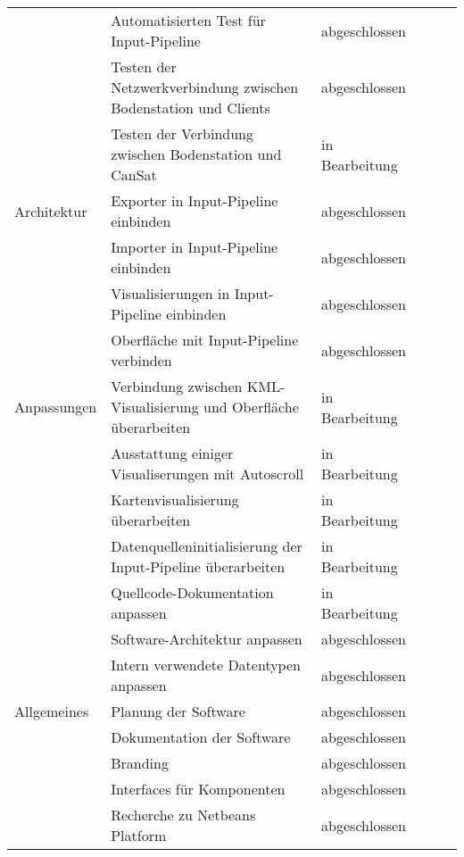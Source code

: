 \begin{table}[H]
\begin{tabular}{p{3cm}p{7cm}p{3cm}rrr}
	& Automatisierten Test für Input-Pipeline & abgeschlossen \\
	& Testen der Netzwerkverbindung zwischen Bodenstation und Clients & abgeschlossen \\
	& Testen der Verbindung zwischen Bodenstation und CanSat & in Bearbeitung \\
	\midrule
	Architektur & Exporter in Input-Pipeline einbinden & abgeschlossen \\
	& Importer in Input-Pipeline einbinden & abgeschlossen \\
	& Visualisierungen in Input-Pipeline einbinden & abgeschlossen \\
	& Oberfläche mit Input-Pipeline verbinden & abgeschlossen \\
	\midrule
	Anpassungen & Verbindung zwischen KML-Visualisierung und Oberfläche überarbeiten & in Bearbeitung \\
	& Ausstattung einiger Visualiserungen mit Autoscroll & in Bearbeitung \\
	& Kartenvisualisierung überarbeiten & in Bearbeitung \\
	& Datenquelleninitialisierung der Input-Pipeline überarbeiten & in Bearbeitung \\
	& Quellcode-Dokumentation anpassen & in Bearbeitung \\
	& Software-Architektur anpassen & abgeschlossen \\
	& Intern verwendete Datentypen anpassen & abgeschlossen \\
	\midrule
	Allgemeines & Planung der Software & abgeschlossen \\
	& Dokumentation der Software & abgeschlossen \\
  & Branding & abgeschlossen \\
  & Interfaces für Komponenten & abgeschlossen \\
  & Recherche zu Netbeans Platform & abgeschlossen \\
  \bottomrule
  \bottomrule
 \end{tabular}
 \end{table}
